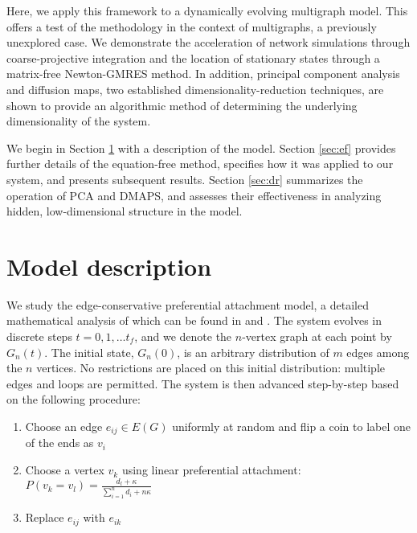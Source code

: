 \documentclass[epjST, final]{svjour}
\newcommand\ignore[1]{}
\begin{document}
\begin{onehalfspace}
Here, we apply this framework to a dynamically evolving multigraph model. This offers a test of the methodology in the context of multigraphs, a previously unexplored case. We demonstrate the acceleration of network simulations through coarse-projective integration and the location of stationary states through a matrix-free Newton-GMRES method. In addition, principal component analysis and diffusion maps, two established dimensionality-reduction techniques, are shown to provide an algorithmic method of determining the underlying dimensionality of the system. \par

We begin in Section \ref{sec:m} with a description of the model. Section \ref{sec:ef} provides further details of the equation-free method, specifies how it was applied to our system, and presents subsequent results. Section \ref{sec:dr} summarizes the operation of PCA and DMAPS, and assesses their effectiveness in analyzing hidden, low-dimensional structure in the model.

\section{Model description}
\label{sec:m}

We study the edge-conservative preferential attachment model, a detailed mathematical analysis of which can be found in \cite{rath_time_2009} and \cite{rath_multigraph_2012}. The system evolves in discrete steps $t = 0,1,\ldots t_f$, and we denote the $n$-vertex graph at each point by $G_n(t)$. The initial state, $G_n(0)$, is an arbitrary distribution of $m$ edges among the $n$ vertices. No restrictions are placed on this initial distribution: multiple edges and loops are permitted.\ignore{an Erd\H{o}s-R\'{e}nyi random graph on $n$ vertices and $m$ edges. Here, however, $m$ may be larger than the total number of edges in a completely-connected $n$-vertex graph so we cannot assign a probability to each edges existence, instead placing $m$ edges at random in the graph.} The system is then advanced step-by-step based on the following procedure:

\begin{enumerate}
\item Choose an edge $e_{ij} \in E(G)$ uniformly at random and flip a coin to label one of the ends as $v_{i}$
\item Choose a vertex $v_{k}$ using linear preferential attachment: $P(v_{k} = v_{l}) = \frac{d_{l} + \kappa}{\sum\limits_{i=1}^{n} d_{i} + n \kappa}$
\item Replace $e_{ij}$ with $e_{ik}$
\end{enumerate}


\end{onehalfspace}
\end{document}
